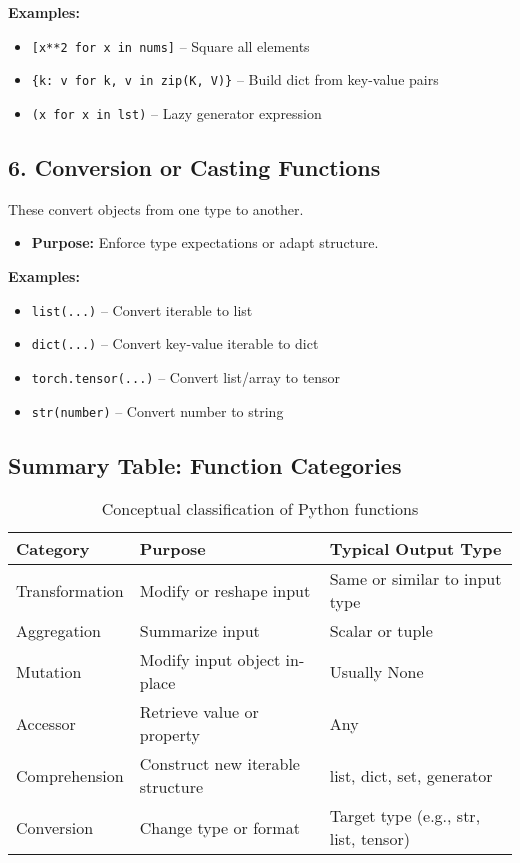 \textbf{Examples:}

\begin{itemize}
	\item \texttt{[x**2 for x in nums]} – Square all elements
	\item \texttt{\{k: v for k, v in zip(K, V)\}} – Build dict from key-value pairs
	\item \texttt{(x for x in lst)} – Lazy generator expression
\end{itemize}

\subsection*{6. Conversion or Casting Functions}

These convert objects from one type to another.

\begin{itemize}
	\item \textbf{Purpose:} Enforce type expectations or adapt structure.
\end{itemize}

\textbf{Examples:}

\begin{itemize}
	\item \texttt{list(...)} – Convert iterable to list
	\item \texttt{dict(...)} – Convert key-value iterable to dict
	\item \texttt{torch.tensor(...)} – Convert list/array to tensor
	\item \texttt{str(number)} – Convert number to string
\end{itemize}

\subsection*{Summary Table: Function Categories}

\begin{table}[h!]
	\centering
	\renewcommand{\arraystretch}{1.3}
	\begin{tabular}{|l|l|l|}
		\hline
		\textbf{Category} & \textbf{Purpose} & \textbf{Typical Output Type} \\
		\hline
		Transformation & Modify or reshape input & Same or similar to input type \\
		Aggregation & Summarize input & Scalar or tuple \\
		Mutation & Modify input object in-place & Usually None \\
		Accessor & Retrieve value or property & Any \\
		Comprehension & Construct new iterable structure & list, dict, set, generator \\
		Conversion & Change type or format & Target type (e.g., str, list, tensor) \\
		\hline
	\end{tabular}
	\caption{Conceptual classification of Python functions}
\end{table}

